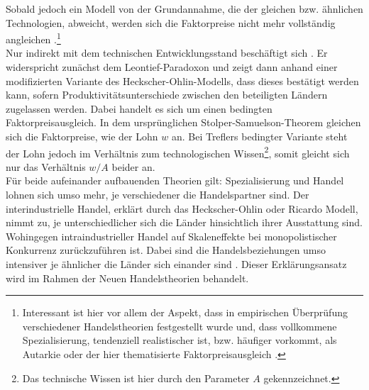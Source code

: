 %
Sobald jedoch ein Modell von der Grundannahme, die der gleichen bzw. ähnlichen Technologien, abweicht, werden sich die Faktorpreise nicht mehr vollständig angleichen \cite{Jones.1970,Davis.2001}.\footnote{Interessant ist hier vor allem der Aspekt, dass in empirischen Überprüfung verschiedener Handelstheorien festgestellt wurde und, dass vollkommene Spezialisierung, tendenziell realistischer ist, bzw. häufiger vorkommt, als Autarkie oder der hier thematisierte Faktorpreisausgleich \cite{Cunat.2001}.}\\
%
Nur indirekt mit dem technischen Entwicklungsstand beschäftigt sich \cite{Trefler.1993}. Er widerspricht zunächst dem Leontief-Paradoxon und zeigt dann anhand einer modifizierten Variante des Heckscher-Ohlin-Modells, dass dieses bestätigt werden kann, sofern Produktivitätsunterschiede zwischen den beteiligten Ländern zugelassen werden. Dabei handelt es sich um einen bedingten Faktorpreisausgleich. In dem ursprünglichen Stolper-Samuelson-Theorem gleichen sich die Faktorpreise, wie der Lohn $w$ an. Bei Treflers bedingter Variante steht der Lohn jedoch im Verhältnis zum technologischen Wissen\footnote{Das technische Wissen ist hier durch den Parameter $A$ gekennzeichnet.}, somit gleicht sich nur das Verhältnis $w/A$ beider an.\bigskip\\
%
Für beide aufeinander aufbauenden Theorien gilt: Spezialisierung und Handel lohnen sich umso mehr, je verschiedener die Handelspartner sind. Der interindustrielle Handel, erklärt durch das Heckscher-Ohlin oder Ricardo Modell, nimmt zu, je unterschiedlicher sich die Länder hinsichtlich ihrer Ausstattung sind. Wohingegen intraindustrieller Handel auf Skaleneffekte bei monopolistischer Konkurrenz zurückzuführen ist. Dabei sind die Handelsbeziehungen umso intensiver je ähnlicher die Länder sich einander sind \cite{Dosi.1993}. Dieser Erklärungsansatz wird im Rahmen der Neuen Handelstheorien behandelt.
%
